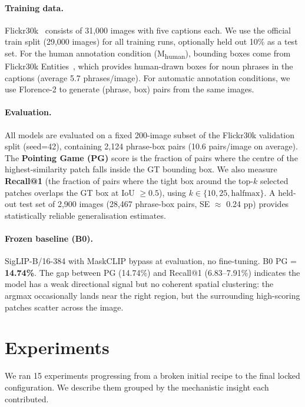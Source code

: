 \documentclass{article}
\begin{document}
\paragraph{Training data.} Flickr30k~\cite{young2014image} consists of 31,000
images with five captions each. We use the official train split (29,000 images)
for all training runs, optionally held out 10\% as a test set.  For the human
annotation condition (M\textsubscript{human}), bounding boxes come from
Flickr30k Entities~\cite{plummer2015flickr30k}, which provides human-drawn
boxes for noun phrases in the captions (average 5.7 phrases/image).  For
automatic annotation conditions, we use Florence-2 to generate (phrase, box)
pairs from the same images.

\paragraph{Evaluation.} All models are evaluated on a fixed 200-image subset
of the Flickr30k validation split (seed=42), containing 2,124 phrase-box pairs
(10.6 pairs/image on average). The \textbf{Pointing Game (PG)} score is the
fraction of pairs where the centre of the highest-similarity patch falls inside
the GT bounding box. We also measure \textbf{Recall@1} (the fraction of pairs
where the tight box around the top-$k$ selected patches overlaps the GT box at
IoU $\geq 0.5$), using $k \in \{10, 25, \text{halfmax}\}$.  A held-out test
set of 2,900 images (28,467 phrase-box pairs, SE $\approx$ 0.24 pp) provides
statistically reliable generalisation estimates.

\paragraph{Frozen baseline (B0).} SigLIP-B/16-384 with MaskCLIP bypass at
evaluation, no fine-tuning. B0 PG = \textbf{14.74\%}. The gap between PG
(14.74\%) and Recall@1 (6.83--7.91\%) indicates the model has a weak
directional signal but no coherent spatial clustering: the argmax occasionally
lands near the right region, but the surrounding high-scoring patches scatter
across the image.

\section{Experiments}
\label{sec:exps}

We ran 15 experiments progressing from a broken initial recipe to the final
locked configuration. We describe them grouped by the mechanistic insight each
contributed.
\end{document}
